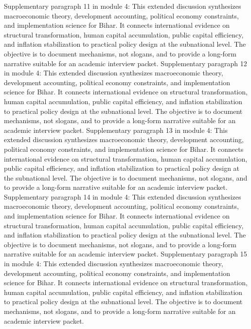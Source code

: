 \documentclass[preprint,12pt]{elsarticle}
\begin{document}
Supplementary paragraph 11 in module 4: This extended discussion synthesizes macroeconomic theory, development accounting, political economy constraints, and implementation science for Bihar. It connects international evidence on structural transformation, human capital accumulation, public capital efficiency, and inflation stabilization to practical policy design at the subnational level. The objective is to document mechanisms, not slogans, and to provide a long-form narrative suitable for an academic interview packet.
Supplementary paragraph 12 in module 4: This extended discussion synthesizes macroeconomic theory, development accounting, political economy constraints, and implementation science for Bihar. It connects international evidence on structural transformation, human capital accumulation, public capital efficiency, and inflation stabilization to practical policy design at the subnational level. The objective is to document mechanisms, not slogans, and to provide a long-form narrative suitable for an academic interview packet.
Supplementary paragraph 13 in module 4: This extended discussion synthesizes macroeconomic theory, development accounting, political economy constraints, and implementation science for Bihar. It connects international evidence on structural transformation, human capital accumulation, public capital efficiency, and inflation stabilization to practical policy design at the subnational level. The objective is to document mechanisms, not slogans, and to provide a long-form narrative suitable for an academic interview packet.
Supplementary paragraph 14 in module 4: This extended discussion synthesizes macroeconomic theory, development accounting, political economy constraints, and implementation science for Bihar. It connects international evidence on structural transformation, human capital accumulation, public capital efficiency, and inflation stabilization to practical policy design at the subnational level. The objective is to document mechanisms, not slogans, and to provide a long-form narrative suitable for an academic interview packet.
Supplementary paragraph 15 in module 4: This extended discussion synthesizes macroeconomic theory, development accounting, political economy constraints, and implementation science for Bihar. It connects international evidence on structural transformation, human capital accumulation, public capital efficiency, and inflation stabilization to practical policy design at the subnational level. The objective is to document mechanisms, not slogans, and to provide a long-form narrative suitable for an academic interview packet.
\end{document}
